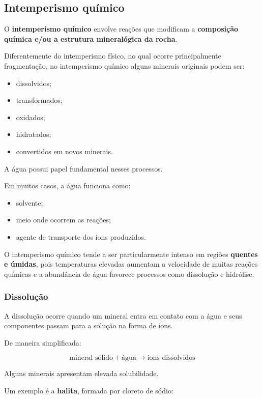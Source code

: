 \documentclass[a4paper,12pt]{article}
\theoremstyle{definition}
\theoremstyle{definition}
\theoremstyle{definition}
\begin{document}
\subsection{Intemperismo químico}

O \textbf{intemperismo químico} envolve reações que modificam a \textbf{composição química e/ou a estrutura mineralógica da rocha}.

Diferentemente do intemperismo físico, no qual ocorre principalmente fragmentação, no intemperismo químico alguns minerais originais podem ser:

\begin{itemize}
    \item dissolvidos;
    \item transformados;
    \item oxidados;
    \item hidratados;
    \item convertidos em novos minerais.
\end{itemize}

A água possui papel fundamental nesses processos.

Em muitos casos, a água funciona como:

\begin{itemize}
    \item solvente;
    \item meio onde ocorrem as reações;
    \item agente de transporte dos íons produzidos.
\end{itemize}

O intemperismo químico tende a ser particularmente intenso em regiões \textbf{quentes e úmidas}, pois temperaturas elevadas aumentam a velocidade de muitas reações químicas e a abundância de água favorece processos como dissolução e hidrólise.

\subsubsection{Dissolução}

A dissolução ocorre quando um mineral entra em contato com a água e seus componentes passam para a solução na forma de íons.

De maneira simplificada:

\[
\text{mineral sólido} + \text{água}
\rightarrow
\text{íons dissolvidos}
\]

Alguns minerais apresentam elevada solubilidade.

Um exemplo é a \textbf{halita}, formada por cloreto de sódio:
\end{document}

